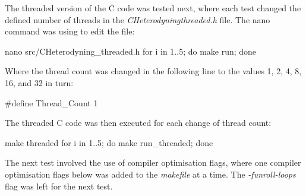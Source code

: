 The threaded version of the C code was tested next, where each test changed the defined number of threads in the  \textit{CHeterodyning\textunderscore threaded.h} file.
The nano command was using to edit the file:

\begin{Cpp}
 nano src/CHeterodyning_threaded.h
 for i in {1..5}; do make run; done
\end{Cpp}

Where the thread count was changed in the following line to the values 1, 2, 4, 8, 16, and 32 in turn:

\begin{Cpp}
 #define Thread_Count 1
\end{Cpp}

The threaded C code was then executed for each change of thread count:

\begin{Cpp}
 make threaded
 for i in {1..5}; do make run_threaded; done
\end{Cpp}

The next test involved the use of compiler optimisation flags, where one compiler optimisation flags below was added to the \textit{makefile} at a time.
The \textit{-funroll-loops} flag was left for the next test.



